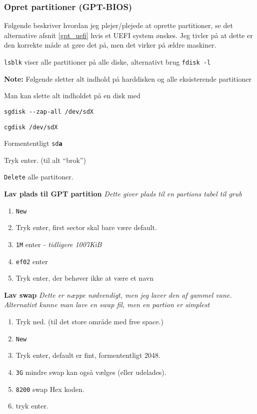 \documentclass[10pt,a4paper,danish]{article}
\newcommand{\note}[1]{\begin{mdframed}[style=note]\textbf{Note:}
    #1\end{mdframed}}
\newcommand{\code}[1]{\colorbox{verbgray}{\texttt{#1}}}
\begin{document}
\subsubsection{Opret partitioner (GPT-BIOS)}
Følgende beskriver hvordan jeg plejer/plejede at oprette partitioner, se det
alternative afsnit \ref{gpt_uefi} hvis et UEFI system ønskes.
Jeg tivler på at dette er den korrekte måde at gøre det på, men det virker på
ældre maskiner.

\code{lsblk} viser alle partitioner på alle diske, alternativt brug \code{fdisk -l}

\note{Følgende sletter alt indhold på harddisken og alle eksisterende partitioner}

\begin{mdframed}[style=boxy]
  Man kan slette alt indholdet på en disk med
\begin{verbatim}
sgdisk --zap-all /dev/sdX
\end{verbatim}
\end{mdframed}

\begin{verbatim}
cgdisk /dev/sdX
\end{verbatim}

Formententligt \texttt{sd\textbf{a}}

Tryk enter. (til alt ``brok'')

\texttt{Delete} alle partitoner.

\textbf{Lav plads til GPT partition}
\textit{Dette giver plads til en partions tabel til grub}\
\begin{enumerate}
\item \texttt{New}
\item Tryk enter, first sector skal bare  være default.
\item \texttt{1M} enter \textit{ - tidligere 1007KiB}
\item \texttt{ef02} enter
\item Tryk enter, der behøver ikke at være et navn
\end{enumerate}

\textbf{Lav swap}
\textit{Dette er næppe nødvendigt, men jeg laver den af gammel vane. Alternativt
kunne man lave en swap fil, men en partion er simplest}
\begin{enumerate}
\item Tryk ned. (til det store område med free space.)
\item \texttt{New}
\item Tryk enter, default er fint, formententligt 2048.
\item \texttt{3G} mindre swap kan også vælges (eller udelades).
\item \texttt{8200} swap Hex koden.
\item tryk enter.
\end{enumerate}
\end{document}
